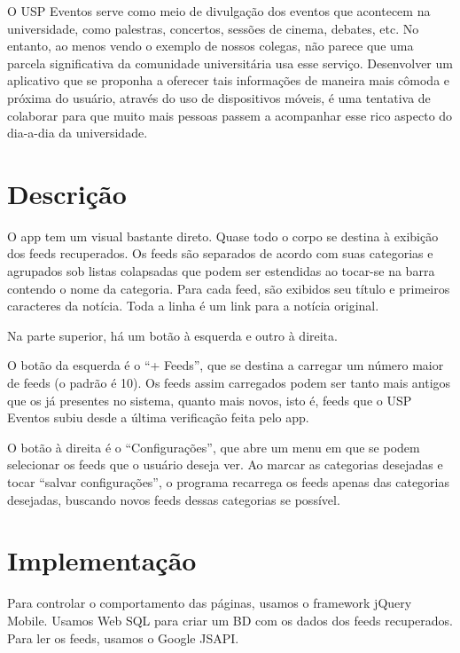 \documentclass[brazil]{article}
\begin{document}
O USP Eventos serve como
meio de divulgação dos eventos que acontecem na universidade, como palestras,
concertos, sessões de cinema, debates, etc. No entanto, ao
menos vendo o exemplo de nossos colegas, não parece que uma parcela
significativa da comunidade universitária usa esse serviço.
Desenvolver um aplicativo que se proponha a oferecer tais informações de
maneira mais cômoda e próxima do usuário, através do uso de dispositivos
móveis, é uma tentativa de colaborar para que muito mais pessoas passem a
acompanhar esse rico aspecto do dia-a-dia da universidade.


\section{Descrição}
O app tem um visual bastante direto. Quase todo o corpo se destina à exibição
dos feeds recuperados. Os feeds são separados de acordo com suas categorias
e agrupados sob listas colapsadas que podem ser estendidas ao tocar-se
na barra contendo o nome da categoria. Para cada feed, são exibidos seu título
e primeiros caracteres da notícia. Toda a linha é um link para a notícia
original.

Na parte superior, há um botão à esquerda e outro à direita.

O botão da esquerda é o ``+ Feeds'', que se destina a carregar um número maior
de feeds (o padrão é 10). Os feeds assim carregados podem ser
tanto mais antigos que os já presentes no sistema, quanto mais novos, isto é,
feeds que o USP Eventos subiu desde a última verificação feita pelo
app.

O botão à direita é o ``Configurações'', que abre um menu em que se podem
selecionar os feeds que o usuário deseja ver. Ao marcar as categorias
desejadas e tocar ``salvar configurações'', o programa recarrega os feeds
apenas das categorias desejadas, buscando novos feeds dessas categorias se
possível.


\section{Implementação}
Para controlar o comportamento das páginas, usamos o framework jQuery Mobile.
Usamos Web SQL para criar um BD com os dados dos feeds recuperados.
Para ler os feeds, usamos o Google JSAPI.
\end{document}
